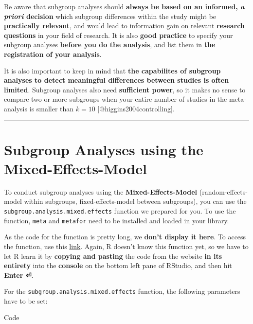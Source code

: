 \documentclass[]{book}
\begin{document}
\begin{rmdachtung}
Be aware that subgroup analyses should \textbf{always be based on an
informed, \emph{a priori} decision} which subgroup differences within
the study might be \textbf{practically relevant}, and would lead to
information gain on relevant \textbf{research questions} in your field
of research. It is also \textbf{good practice} to specify your subgroup
analyses \textbf{before you do the analysis}, and list them in
\textbf{the registration of your analysis}.

It is also important to keep in mind that \textbf{the capabilites of
subgroup analyses to detect meaningful differences between studies is
often limited}. Subgroup analyses also need \textbf{sufficient power},
so it makes no sense to compare two or more subgroups when your entire
number of studies in the meta-analysis is smaller than \(k=10\)
{[}@higgins2004controlling{]}.
\end{rmdachtung}

\begin{center}\rule{0.5\linewidth}{\linethickness}\end{center}

\hypertarget{mixed}{%
\section{Subgroup Analyses using the Mixed-Effects-Model}\label{mixed}}

To conduct subgroup analyses using the \textbf{Mixed-Effects-Model} (random-effects-model within subgroups, fixed-effects-model between subgroups), you can use the \texttt{subgroup.analysis.mixed.effects} function we prepared for you. To use the function, \texttt{meta} and \texttt{metafor} need to be installed and loaded in your library.

As the code for the function is pretty long, we \textbf{don't display it here}. To access the function, use this \href{https://github.com/MathiasHarrer/Doing-Meta-Analysis-in-R/blob/master/subgroup_analyses_mixed_effects_function.R}{link}. Again, R doesn't know this function yet, so we have to let R learn it by \textbf{copying and pasting} the code from the website \textbf{in its entirety} into the \textbf{console} on the bottom left pane of RStudio, and then hit \textbf{Enter ⏎}.

For the \texttt{subgroup.analysis.mixed.effects} function, the following parameters have to be set:

Code
\end{document}
